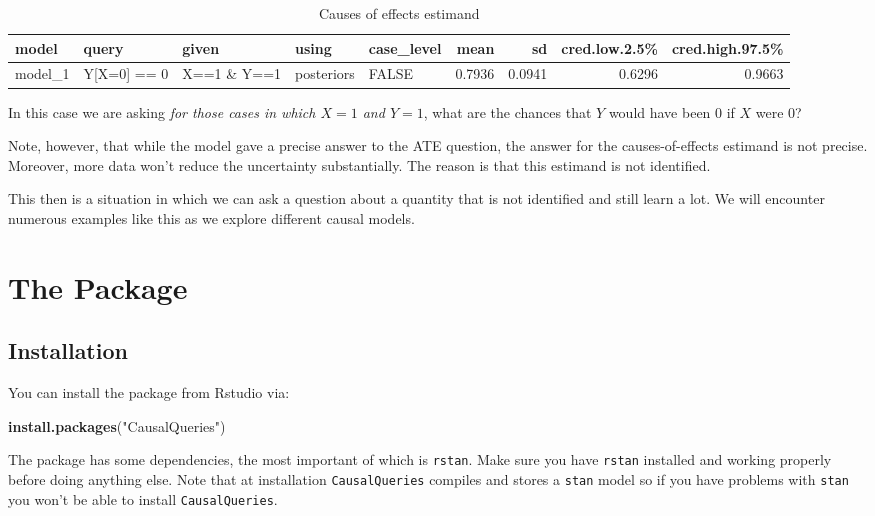 \documentclass[
  12pt,
]{book}
\newenvironment{Shaded}{\begin{snugshade}}{\end{snugshade}}
\newcommand{\FunctionTok}[1]{\textcolor[rgb]{0.13,0.29,0.53}{\textbf{#1}}}
\newcommand{\NormalTok}[1]{#1}
\newcommand{\StringTok}[1]{\textcolor[rgb]{0.31,0.60,0.02}{#1}}
\begin{document}
\begin{table}

\caption{\label{tab:unnamed-chunk-11}Causes of effects estimand}
\centering
\begin{tabular}[t]{l|l|l|l|l|r|r|r|r}
\hline
model & query & given & using & case\_level & mean & sd & cred.low.2.5\% & cred.high.97.5\%\\
\hline
model\_1 & Y[X=0] == 0 & X==1 \& Y==1 & posteriors & FALSE & 0.7936 & 0.0941 & 0.6296 & 0.9663\\
\hline
\end{tabular}
\end{table}

In this case we are asking \emph{for those cases in which \(X=1\) and \(Y=1\)}, what are the chances that \(Y\) would have been \(0\) if \(X\) were \(0\)?

Note, however, that while the model gave a precise answer to the ATE question, the answer for the causes-of-effects estimand is not precise. Moreover, more data won't reduce the uncertainty substantially. The reason is that this estimand is not identified.

This then is a situation in which we can ask a question about a quantity that is not identified and still learn a lot. We will encounter numerous examples like this as we explore different causal models.

\hypertarget{part-the-package}{%
\part{The Package}\label{part-the-package}}

\hypertarget{package}{%
\chapter{Installation}\label{package}}

You can install the package from Rstudio via:

\begin{Shaded}
\begin{Highlighting}[]
\FunctionTok{install.packages}\NormalTok{(}\StringTok{"CausalQueries"}\NormalTok{)}
\end{Highlighting}
\end{Shaded}

The package has some dependencies, the most important of which is \texttt{rstan}. Make sure you have \texttt{rstan} installed and working properly before doing anything else. Note that at installation \texttt{CausalQueries} compiles and stores a \texttt{stan} model so if you have problems with \texttt{stan} you won't be able to install \texttt{CausalQueries}.
\end{document}
